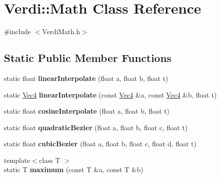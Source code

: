 \hypertarget{class_verdi_1_1_math}{\section{\-Verdi\-:\-:\-Math \-Class \-Reference}
\label{class_verdi_1_1_math}
}


{\ttfamily \#include $<$\-Verdi\-Math.\-h$>$}

\subsection*{\-Static \-Public \-Member \-Functions}
\begin{DoxyCompactItemize}
\item 
\hypertarget{class_verdi_1_1_math_a060c33cb129e6fa17a20066d82a9db5c}{static float {\bfseries linear\-Interpolate} (float a, float b, float t)}\label{class_verdi_1_1_math_a060c33cb129e6fa17a20066d82a9db5c}

\item 
\hypertarget{class_verdi_1_1_math_a9d12dda642b713bacf34e768a7cde239}{static \hyperlink{class_verdi_1_1_vec4}{\-Vec4} {\bfseries linear\-Interpolate} (const \hyperlink{class_verdi_1_1_vec4}{\-Vec4} \&a, const \hyperlink{class_verdi_1_1_vec4}{\-Vec4} \&b, float t)}\label{class_verdi_1_1_math_a9d12dda642b713bacf34e768a7cde239}

\item 
\hypertarget{class_verdi_1_1_math_ab88dbc34dc4c1eb275571b9a5af52160}{static float {\bfseries cosine\-Interpolate} (float a, float b, float t)}\label{class_verdi_1_1_math_ab88dbc34dc4c1eb275571b9a5af52160}

\item 
\hypertarget{class_verdi_1_1_math_a6efb5bb73f24710d1b4371d176752b2b}{static float {\bfseries quadratic\-Bezier} (float a, float b, float c, float t)}\label{class_verdi_1_1_math_a6efb5bb73f24710d1b4371d176752b2b}

\item 
\hypertarget{class_verdi_1_1_math_ac2f05239dc1012ec2ea34baefa1f790b}{static float {\bfseries cubic\-Bezier} (float a, float b, float c, float d, float t)}\label{class_verdi_1_1_math_ac2f05239dc1012ec2ea34baefa1f790b}

\item 
\hypertarget{class_verdi_1_1_math_abea8a299acddbad91136bcd208335c11}{{\footnotesize template$<$class T $>$ }\\static \-T {\bfseries maximum} (const \-T \&a, const \-T \&b)}\label{class_verdi_1_1_math_abea8a299acddbad91136bcd208335c11}


\end{DoxyCompactItemize}
